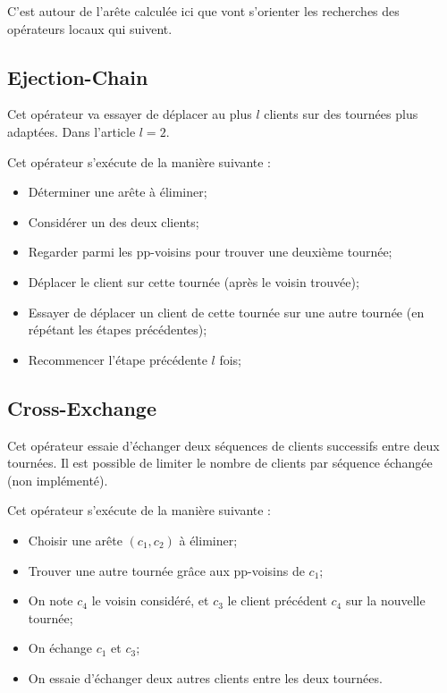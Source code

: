 \documentclass[a4paper,11pt]{article}%
\begin{document}
C'est autour de l'arête calculée ici que vont s'orienter les recherches des opérateurs locaux qui suivent.
 
\subsection*{Ejection-Chain}

Cet opérateur va essayer de déplacer au plus $l$ clients sur des tournées plus adaptées. Dans l'article $l = 2$.

Cet opérateur s'exécute de la manière suivante :
\begin{itemize}
\item Déterminer une arête à éliminer; 
\item Considérer un des deux clients;
\item Regarder parmi les pp-voisins pour trouver une deuxième tournée;
\item Déplacer le client sur cette tournée (après le voisin trouvée);
\item Essayer de déplacer un client de cette tournée sur une autre tournée (en répétant les étapes précédentes);
\item Recommencer l'étape précédente $l$ fois; \\
\end{itemize} 

\subsection*{Cross-Exchange}

Cet opérateur essaie d'échanger deux séquences de clients successifs entre deux tournées. Il est possible de limiter le nombre de clients par séquence échangée (non implémenté).

Cet opérateur s'exécute de la manière suivante :
\begin{itemize}
\item Choisir une arête $(c_1,c_2)$ à éliminer;
\item Trouver une autre tournée grâce aux pp-voisins de $c_1$; 
\item On note $c_4$ le voisin considéré, et $c_3$ le client précédent $c_4$ sur la nouvelle tournée;
\item On échange $c_1$ et $c_3$;
\item On essaie d'échanger deux autres clients entre les deux tournées. \\
\end{itemize}
\end{document}
